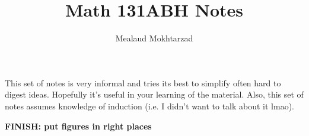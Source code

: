 \documentclass{article}
\title{Math 131ABH Notes}
\author{Mealaud Mokhtarzad}
\date{}
\begin{document}
\maketitle

This set of notes is very informal and tries its best to simplify often hard to digest ideas. Hopefully it's useful in your learning of the material. Also, this set of notes assumes knowledge of induction (i.e. I didn't want to talk about it lmao).

\textbf{FINISH: put figures in right places}

\newpage

\renewcommand{\headrulewidth}{0pt}
\tableofcontents
\newpage

\renewcommand{\headrulewidth}{0.4pt}


\newpage

\newpage

\newpage

\newpage

\newpage

\newpage

\newpage

\end{document}
